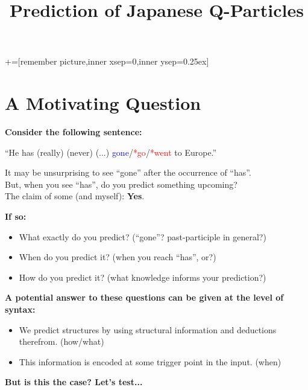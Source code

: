 \documentclass[12pt]{article}
\title{{\normalsize\bfseries {Prediction of Japanese Q-Particles}}}
\author{\normalsize\bfseries {}}
\date{\vspace{-10ex}}
\begin{document}
\usetikzlibrary{topaths}
+=[remember picture,inner xsep=0,inner ysep=0.25ex]


\maketitle

\section{A Motivating Question}
\textbf{Consider the following sentence:}
\begin{center}
    ``He has (really) (never) (...) \textcolor{blue}{gone}/\textcolor{red}{*go}/\textcolor{red}{*went} to Europe.''
\end{center}

\begin{center}
    It may be unsurprising to see ``gone'' after the occurrence of ``has''.\\
    But, when you see ``has'', do you predict something upcoming?\\
    The claim of some (and myself): \textbf{Yes}.
\end{center}


\textbf{If so:}
\begin{itemize}
    \item What exactly do you predict? (``gone''? past-participle in general?)
    \item When do you predict it? (when you reach ``has'', or?)
    \item How do you predict it? (what knowledge informs your prediction?)
\end{itemize}

\vspace{0.2cm}

\textbf{A potential answer to these questions can be given at the level of syntax:}

\begin{itemize}%
    \renewcommand{\labelitemi}{$\Rightarrow$}
    \item We predict structures by using structural information and deductions therefrom. (how/what)
    \item This information is encoded at some trigger point in the input. (when)
\end{itemize} 

\vspace{0.2cm}
\begin{center}
    \textbf{But is this the case? Let's test...}
\end{center}
\end{document}
